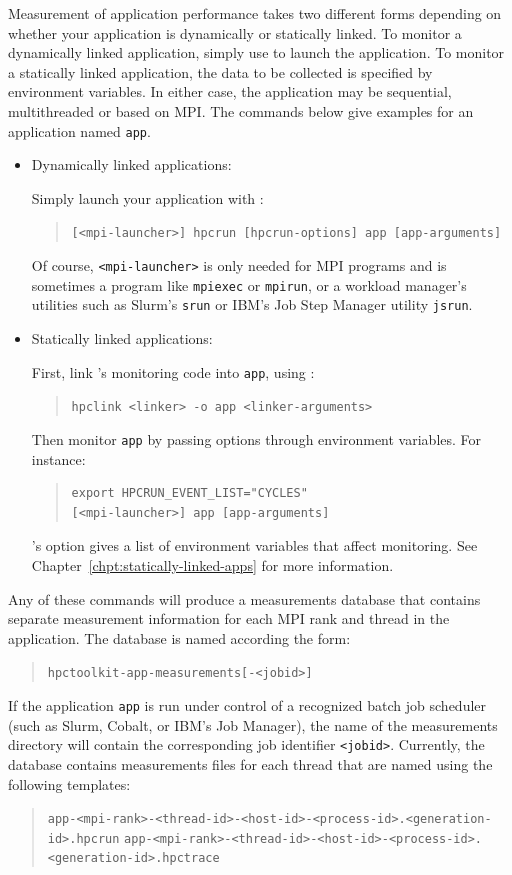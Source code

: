 \documentclass[11pt,twoside,letterpaper]{report}
\begin{document}
Measurement of application performance takes two different forms depending on whether your application is dynamically or statically linked.
To monitor a dynamically linked application, simply use \hpcrun{} to launch the application.
To monitor a statically linked application, the data to be collected is specified by environment variables.
In either case, the application may be sequential, multithreaded or based on MPI.
The commands below give examples for an application named \texttt{app}.
%
\begin{itemize}

\item Dynamically linked applications:\hfill

Simply launch your application with \hpcrun{}:
\begin{quote}
  \verb|[<mpi-launcher>] hpcrun [hpcrun-options] app [app-arguments]|
\end{quote}
Of course, \texttt{<mpi-launcher>} is only needed for MPI programs and is sometimes a program like \texttt{mpiexec} or \texttt{mpirun}, or a workload manager's utilities such as Slurm's {\tt srun} or IBM's Job Step Manager utility {\tt jsrun}.

\item Statically linked applications:\hfill

First, link \hpcrun{}'s monitoring code into \texttt{app}, using \hpclink{}:
\begin{quote}
  \verb|hpclink <linker> -o app <linker-arguments>|
\end{quote}

Then monitor \texttt{app} by passing \hpcrun{} options through environment variables.
For instance:
\begin{quote}
\begin{verbatim}
export HPCRUN_EVENT_LIST="CYCLES"
[<mpi-launcher>] app [app-arguments]
\end{verbatim}
\end{quote}
\hpclink{}'s  option gives a list of environment variables that affect monitoring.
See Chapter~\ref{chpt:statically-linked-apps} for more information.

\end{itemize}
%
Any of these commands will produce a measurements database that contains separate measurement information for each MPI rank and thread in the application.
The database is named according the form:
\begin{quote}
  \verb|hpctoolkit-app-measurements[-<jobid>]|
\end{quote}
If the application \texttt{app} is run under control of a recognized batch job scheduler (such as Slurm, Cobalt, or IBM's Job Manager), the name of the measurements directory will contain the corresponding job identifier \texttt{<jobid>}.
Currently, the database contains measurements files for each thread that are named using the following templates:
\begin{quote}
  \verb|app-<mpi-rank>-<thread-id>-<host-id>-<process-id>.<generation-id>.hpcrun|
    \verb|app-<mpi-rank>-<thread-id>-<host-id>-<process-id>.<generation-id>.hpctrace|
\end{quote}
\end{document}
